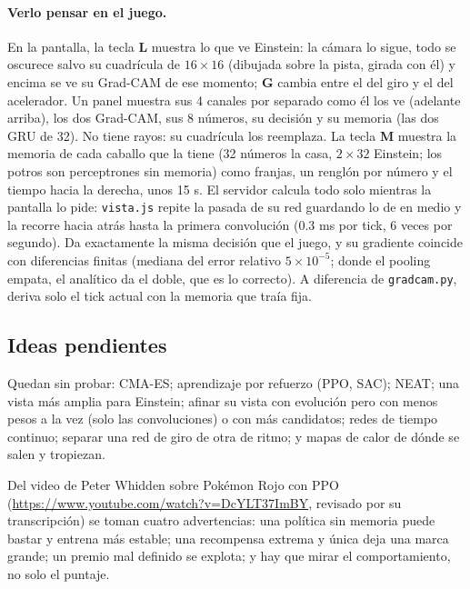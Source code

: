 \documentclass[11pt,letterpaper]{article}
\begin{document}
\paragraph{Verlo pensar en el juego.} En la pantalla, la tecla \textbf{L} muestra lo que ve Einstein: la cámara lo sigue, todo se oscurece salvo su cuadrícula de $16 \times 16$ (dibujada sobre la pista, girada con él) y encima se ve su Grad-CAM de ese momento; \textbf{G} cambia entre el del giro y el del acelerador. Un panel muestra sus 4 canales por separado como él los ve (adelante arriba), los dos Grad-CAM, sus 8 números, su decisión y su memoria (las dos GRU de 32). No tiene rayos: su cuadrícula los reemplaza. La tecla \textbf{M} muestra la memoria de cada caballo que la tiene (32 números la casa, $2 \times 32$ Einstein; los potros son perceptrones sin memoria) como franjas, un renglón por número y el tiempo hacia la derecha, unos 15 s. El servidor calcula todo solo mientras la pantalla lo pide: \texttt{vista.js} repite la pasada de su red guardando lo de en medio y la recorre hacia atrás hasta la primera convolución (0.3 ms por tick, 6 veces por segundo). Da exactamente la misma decisión que el juego, y su gradiente coincide con diferencias finitas (mediana del error relativo $5 \times 10^{-5}$; donde el pooling empata, el analítico da el doble, que es lo correcto). A diferencia de \texttt{gradcam.py}, deriva solo el tick actual con la memoria que traía fija.

\subsection{Ideas pendientes}
Quedan sin probar: CMA-ES; aprendizaje por refuerzo (PPO, SAC); NEAT; una vista más amplia para Einstein; afinar su vista con evolución pero con menos pesos a la vez (solo las convoluciones) o con más candidatos; redes de tiempo continuo; separar una red de giro de otra de ritmo; y mapas de calor de dónde se salen y tropiezan.

Del video de Peter Whidden sobre Pokémon Rojo con PPO (\url{https://www.youtube.com/watch?v=DcYLT37ImBY}, revisado por su transcripción) se toman cuatro advertencias: una política sin memoria puede bastar y entrena más estable; una recompensa extrema y única deja una marca grande; un premio mal definido se explota; y hay que mirar el comportamiento, no solo el puntaje.
\end{document}
